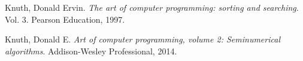 \documentclass[a0paper,portrait,margin=1.5cm]{csposter}
\begin{document}
\begin{poster}
{\begin{thebibliography}{1}
 Knuth, Donald Ervin. \textit{The art of computer programming: sorting and searching}. Vol. 3. Pearson Education, 1997.

 Knuth, Donald E. \textit{Art of computer programming, volume 2: Seminumerical algorithms}. Addison-Wesley Professional, 2014.

\end{thebibliography}

}


\end{poster}
\end{document}
